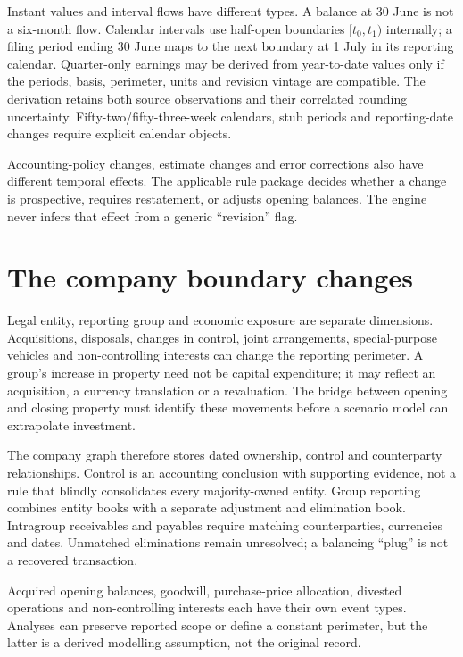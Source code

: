 Instant values and interval flows have different types. A balance at 30 June
is not a six-month flow. Calendar intervals use half-open boundaries
$[t_0,t_1)$ internally; a filing period ending 30 June maps to the next boundary
at 1 July in its reporting calendar. Quarter-only earnings may be derived from
year-to-date values only if the periods, basis, perimeter, units and revision
vintage are compatible. The derivation retains both source observations and
their correlated rounding uncertainty. Fifty-two/fifty-three-week calendars,
stub periods and reporting-date changes require explicit calendar objects.

Accounting-policy changes, estimate changes and error corrections also have
different temporal effects. The applicable rule package decides whether a
change is prospective, requires restatement, or adjusts opening balances.
The engine never infers that effect from a generic ``revision'' flag.

\section{The company boundary changes}

Legal entity, reporting group and economic exposure are separate dimensions.
Acquisitions, disposals, changes in control, joint arrangements, special-purpose
vehicles and non-controlling interests can change the reporting perimeter.
A group's increase in property need not be capital expenditure; it may reflect
an acquisition, a currency translation or a revaluation. The bridge between
opening and closing property must identify these movements before a scenario
model can extrapolate investment.

The company graph therefore stores dated ownership, control and counterparty
relationships. Control is an accounting conclusion with supporting evidence,
not a rule that blindly consolidates every majority-owned entity. Group
reporting combines entity books with a separate adjustment and elimination
book. Intragroup receivables and payables require matching counterparties,
currencies and dates. Unmatched eliminations remain unresolved; a balancing
``plug'' is not a recovered transaction.

Acquired opening balances, goodwill, purchase-price allocation, divested
operations and non-controlling interests each have their own event types.
Analyses can preserve reported scope or define a constant perimeter, but the
latter is a derived modelling assumption, not the original record.

